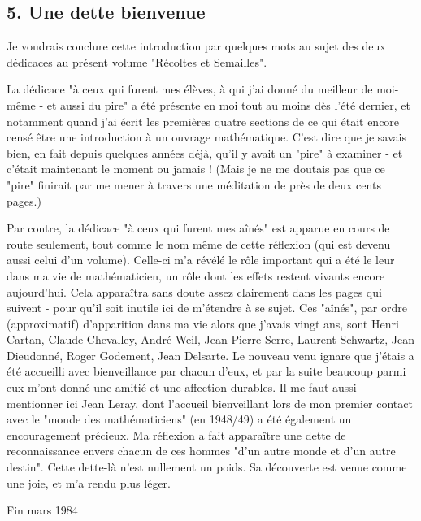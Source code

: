 \subsection{5. Une dette bienvenue}

Je voudrais conclure cette introduction par quelques mots au sujet des deux dédicaces au présent volume "Récoltes et Semailles".

La dédicace "à ceux qui furent mes élèves, à qui j’ai donné du meilleur de moi-même - et aussi du pire" a été présente en moi tout au moins dès l'été dernier, et notamment quand j'ai écrit les premières quatre sections de ce qui était encore censé être une introduction à un ouvrage mathématique. C'est dire que je savais bien, en fait depuis quelques années déjà, qu'il y avait un "pire" à examiner - et c'était maintenant le moment ou jamais ! (Mais je ne me doutais pas que ce "pire" finirait par me mener à travers une méditation de près de deux cents pages.)

Par contre, la dédicace "à ceux qui furent mes aînés" est apparue en cours de route seulement, tout comme le nom même de cette réflexion (qui est devenu aussi celui d'un volume). Celle-ci m'a révélé le rôle important qui a été le leur dans ma vie de mathématicien, un rôle dont les effets restent vivants encore aujourd'hui. Cela apparaîtra sans doute assez clairement dans les pages qui suivent - pour qu'il soit inutile ici de m'étendre à se sujet. Ces "aînés", par ordre (approximatif) d'apparition dans ma vie alors que j'avais vingt ans, sont Henri Cartan, Claude Chevalley, André Weil, Jean-Pierre Serre, Laurent Schwartz, Jean Dieudonné, Roger Godement, Jean Delsarte. Le nouveau venu ignare que j'étais a été accueilli avec bienveillance par chacun d'eux, et par la suite beaucoup parmi eux m'ont donné une amitié et une affection durables. Il me faut aussi mentionner ici Jean Leray, dont l'accueil bienveillant lors de mon premier contact avec le "monde des mathématiciens" (en 1948/49) a été également un encouragement précieux. Ma réflexion a fait apparaître une dette de reconnaissance envers chacun de ces hommes "d'un autre monde et d'un autre destin". Cette dette-là n'est nullement un poids. Sa découverte est venue comme une joie, et m'a rendu plus léger.

\hfill Fin mars 1984

